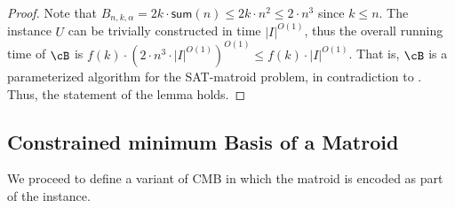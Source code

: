 \begin{proof}
	Note that $B_{n,k,\alpha} = 2k \cdot \textsf{sum}(n) \leq 2k \cdot n^2 \leq 2 \cdot n^3$ since $k \leq n$.  The instance $U$ can be trivially constructed in time $|I|^{O(1)}$, thus the overall running time of $\cB$ is $f(k)\cdot (2\cdot n^3\cdot |I|^{O(1)})^{O(1)} \leq f(k)\cdot |I|^{O(1)}$. That is, $\cB$ is a parameterized algorithm for the SAT-matroid problem, in contradiction to . Thus, the statement of the lemma holds.
\end{proof}

























\subsection{Constrained minimum Basis of a Matroid}

We proceed to define a variant of CMB in which the matroid is encoded as part of the instance.

